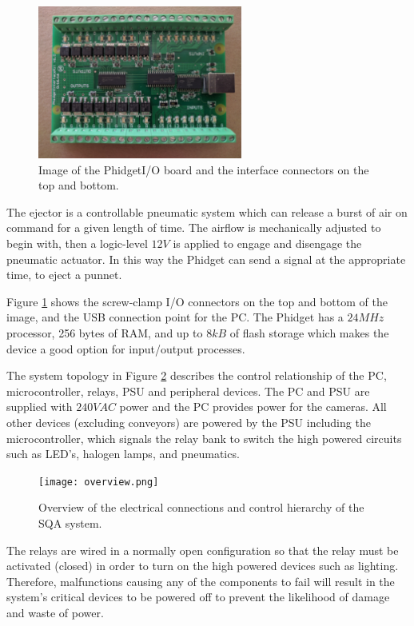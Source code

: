 \documentclass[fleqn,twoside,12pt]{report}
\begin{document}
\begin{figure}
	\begin{center}
		\includegraphics[width=0.6\textwidth]{phidget.jpg}
	\end{center}
	\caption{Image of the Phidget\texttrademark I/O board and the interface connectors on the top and bottom.}
	\label{fig:phidget}
\end{figure} 


The ejector is a controllable pneumatic system which can release a burst of air on command for a given length of time. The airflow is mechanically adjusted to begin with, then a logic-level $12V$ is applied to engage and disengage the pneumatic actuator. In this way the Phidget can send a signal at the appropriate time, to eject a punnet.


Figure \ref{fig:phidget} shows the screw-clamp I/O connectors on the top and bottom of the image, and the USB connection point for the PC. The Phidget has a $24MHz$ processor, 256 bytes of RAM, and up to $8kB$ of flash storage which makes the device a good option for input/output processes.


The system topology in Figure \ref{fig:overview} describes the control relationship of the PC, microcontroller, relays, PSU and peripheral devices. The PC and PSU are supplied with $240VAC$ power and the PC provides power for the cameras. All other devices (excluding conveyors) are powered by the PSU including the microcontroller, which signals the relay bank to switch the high powered circuits such as LED's, halogen lamps, and pneumatics. 


\begin{figure}[h]
	\centering
	\texttt{[image: overview.png]}
	\caption{Overview of the electrical connections and control hierarchy of the SQA system.}
	\label{fig:overview}
\end{figure} 

The relays are wired in a normally open configuration so that the relay must be activated (closed) in order to turn on the high powered devices such as lighting. Therefore, malfunctions causing any of the components to fail will result in the system's critical devices to be powered off to prevent the likelihood of damage and waste of power.
\end{document}
